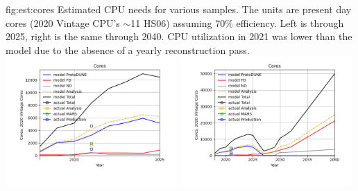 \documentclass[../main-v1.tex]{subfiles}
\begin{document}
\begin{dunefigure}
{fig:est:cores}
{Estimated CPU needs for  various samples.  The units are present day cores  (2020 Vintage CPU's $\sim$11 HS06) assuming 70\% efficiency. Left is through 2025, right is the same through 2040. CPU utilization in 2021 was lower than the model due to the absence of a yearly reconstruction pass.}
\includegraphics[width=0.49\textwidth]{graphics/IntroFigures/2025/Parameters_2022-03-04-2025-Cores.png}
\includegraphics[width=0.49\textwidth]{graphics/IntroFigures/2040/Parameters_2022-03-04-2040-Cores.png}
\end{dunefigure}
\end{document}

